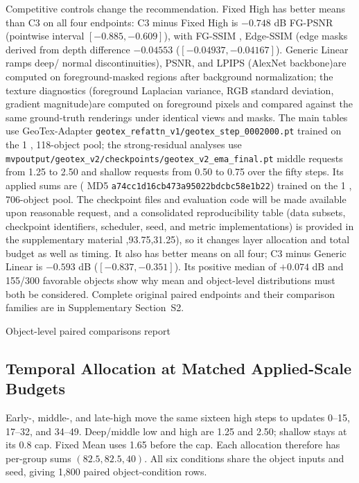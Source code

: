 \documentclass[times,twocolumn,final]{elsarticle}
\providecommand{\DIFadd}[1]{{\protect\color{blue} \sf #1}} %
\providecommand{\DIFdel}[1]{{\protect\color{red} \scriptsize #1}} %
\providecommand{\DIFaddbegin}{} %
\providecommand{\DIFaddend}{} %
\providecommand{\DIFdelbegin}{} %
\providecommand{\DIFdelend}{} %
\begin{document}
\DIFaddbegin \DIFadd{Competitive controls change the recommendation. Fixed High has better means than C3 on all four endpoints: C3 minus Fixed High is $-0.748$ dB FG-PSNR (pointwise interval $[-0.885,-0.609]$), with }\DIFaddend FG-SSIM \DIFdelbegin \DIFdel{, Edge-SSIM (edge masks derived from depth}\DIFdelend \DIFaddbegin \DIFadd{difference $-0.04553$ ($[-0.04937,-0.04167]$). Generic Linear ramps deep}\DIFaddend /\DIFdelbegin \DIFdel{normal discontinuities), PSNR, and LPIPS (AlexNet backbone)are computed on foreground-masked regions after background normalization; the texture diagnostics (foreground Laplacian variance, RGB standard deviation, gradient magnitude)are computed on foreground pixels and compared against the same ground-truth renderings under identical views and masks. The main tables use GeoTex-Adapter \texttt{geotex\_refattn\_v1/geotex\_step\_0002000.pt} trained on the 1}%
\DIFdel{, }%
\DIFdel{118-object pool; the strong-residual analyses use \texttt{mvpoutput/geotex\_v2/checkpoints/geotex\_v2\_ema\_final.pt} }\DIFdelend \DIFaddbegin \DIFadd{middle requests from 1.25 to 2.50 and shallow requests from 0.50 to 0.75 over the fifty steps. Its applied sums are }\DIFaddend (\DIFdelbegin \DIFdel{MD5 \texttt{a74cc1d16cb473a95022bdcbc58e1b22}) trained on the 1}%
\DIFdel{, }%
\DIFdel{706-object pool. The checkpoint files and evaluation code will be made available upon reasonable request, and a consolidated reproducibility table (data subsets, checkpoint identifiers, scheduler, seed, and metric implementations) is provided in the supplementary material}\DIFdelend \DIFaddbegin \DIFadd{93.75,93.75,31.25), so it changes layer allocation and total budget as well as timing. It also has better means on all four; C3 minus Generic Linear is $-0.593$ dB ($[-0.837,-0.351]$). Its positive median of $+0.074$ dB and 155/300 favorable objects show why mean and object-level distributions must both be considered. Complete original paired endpoints and their comparison families are in Supplementary Section~S2}\DIFaddend .

\DIFdelbegin %
\DIFdel{Object-level paired comparisons report }\DIFdelend \DIFaddbegin \subsection{Temporal Allocation at Matched Applied-Scale Budgets}
\label{subsec:matched-budget300}
\DIFadd{Early-, middle-, and late-high move the same sixteen high steps to updates 0--15, 17--32, and 34--49. Deep/middle low and high are 1.25 and 2.50; shallow stays at its 0.8 cap. Fixed Mean uses 1.65 before the cap. Each allocation therefore has per-group sums $(82.5,82.5,40)$. All six conditions share the object inputs and seed, giving 1,800 paired object-condition rows.
}
\end{document}
